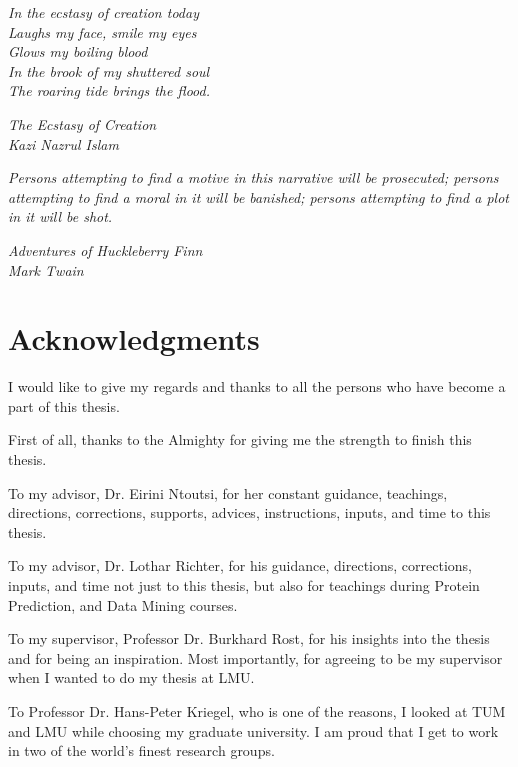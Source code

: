 \thispagestyle{empty}


\vspace*{2mm}

\epigraph{\textit{In the ecstasy of creation today\\
        Laughs my face, smile my eyes \\
        Glows my boiling blood \\
        In the brook of my shuttered soul \\
        The roaring tide brings the flood.} }{\textit{The Ecstasy of Creation \\ Kazi Nazrul Islam}}

\epigraph{\textit{Persons attempting to find a motive in this narrative will be prosecuted;
        persons attempting to find a moral in it will be banished;
        persons attempting to find a plot in it will be shot.} }
        {\textit{Adventures of Huckleberry Finn \\ Mark Twain}}



\section* {Acknowledgments}
\vspace{7mm}
I would like to give my regards and thanks to all the persons who have become a part of this thesis.

\vspace{4mm} First of all, thanks to the Almighty for giving me the strength to finish this thesis.

\vspace{2mm} To my advisor, Dr. Eirini Ntoutsi, for her constant guidance, teachings, directions, corrections, supports, advices, instructions, inputs, and time to this thesis.

\vspace{2mm} To my advisor, Dr. Lothar Richter, for his guidance, directions, corrections, inputs, and time not just to this thesis, but also for teachings during Protein Prediction, and Data Mining courses.

\vspace{2mm} To my supervisor, Professor Dr. Burkhard Rost, for his insights into the thesis and for being an inspiration. Most importantly, for agreeing to be my supervisor when I wanted to do my thesis at LMU.

\vspace{2mm} To Professor Dr. Hans-Peter Kriegel, who is one of the reasons, I looked at TUM and LMU while choosing my graduate university. I am proud that I get to work in two of the world's finest research groups.

